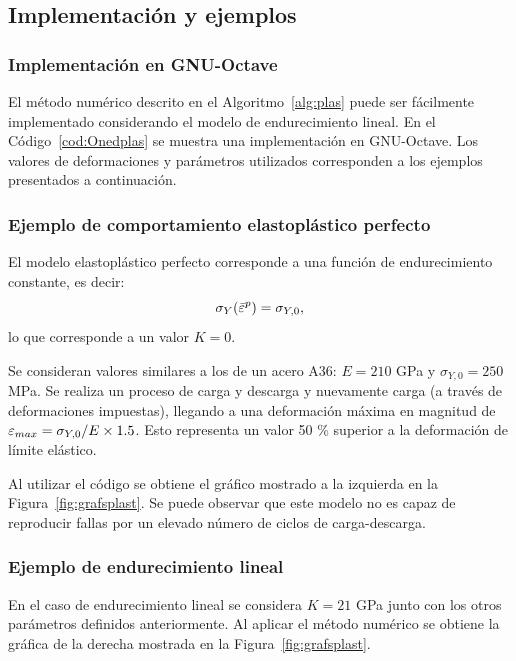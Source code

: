 \subsection{Implementación y ejemplos}

\subsubsection{Implementación en GNU-Octave}

El método numérico descrito en el Algoritmo~\ref{alg:plas} puede ser fácilmente implementado considerando el modelo de endurecimiento lineal. %
%
En el Código~\ref{cod:Onedplas} se muestra una implementación en GNU-Octave. Los valores de deformaciones y parámetros utilizados corresponden a los ejemplos presentados a continuación.



\subsubsection{Ejemplo de comportamiento elastoplástico perfecto}

El modelo elastoplástico perfecto corresponde a una función de endurecimiento constante, es decir:
%
\begin{equation}
\sigma_Y (\bar{\varepsilon}^p) = \sigma_{Y,0},
\end{equation}
%
lo que corresponde a un valor $K=0$.

Se consideran valores similares a los de un acero A36: $E=210$ GPa y $\sigma_{Y,0} = 250 $ MPa. %
%
Se realiza un proceso de carga y descarga y nuevamente carga (a través de deformaciones impuestas), llegando a una deformación máxima en magnitud de $\varepsilon_{max} = \sigma_{Y,0} / E \times 1.5$. Esto representa un valor 50 \% superior a la deformación de límite elástico.

Al utilizar el código se obtiene el gráfico mostrado a la izquierda en la Figura~\ref{fig:grafsplast}. %
%
Se puede observar que este modelo no es capaz de reproducir fallas por un elevado número de ciclos de carga-descarga. 

\subsubsection{Ejemplo de endurecimiento lineal}

En el caso de endurecimiento lineal se considera $K= 21$ GPa junto con los otros parámetros definidos anteriormente. %
%
Al aplicar el método numérico se obtiene la gráfica de la derecha mostrada en la Figura~\ref{fig:grafsplast}.


